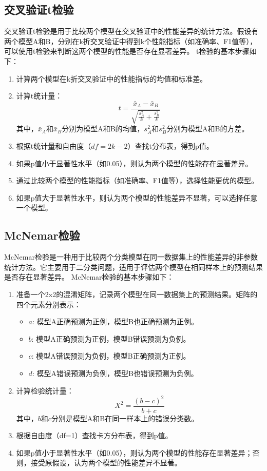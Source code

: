 \subsection{交叉验证t检验}
交叉验证t检验是用于比较两个模型在交叉验证中的性能差异的统计方法。假设有两个模型A和B，分别在k折交叉验证中得到k个性能指标（如准确率、F1值等），可以使用t检验来判断这两个模型的性能是否存在显著差异。
t检验的基本步骤如下：
\begin{enumerate}
    \item 计算两个模型在k折交叉验证中的性能指标的均值和标准差。
    \item 计算t统计量：
    \begin{equation}
        t = \frac{\bar{x}_A - \bar{x}_B}{\sqrt{\frac{s_A^2}{k} + \frac{s_B^2}{k}}}
    \end{equation}
    其中，$\bar{x}_A$和$\bar{x}_B$分别为模型A和B的均值，$s_A^2$和$s_B^2$分别为模型A和B的方差。
    \item 根据t统计量和自由度（$df = 2k - 2$）查找t分布表，得到p值。
    \item 如果p值小于显著性水平（如0.05），则认为两个模型的性能存在显著差异。
    \item 通过比较两个模型的性能指标（如准确率、F1值等），选择性能更优的模型。
    \item 如果p值大于显著性水平，则认为两个模型的性能差异不显著，可以选择任意一个模型。
\end{enumerate}
\subsection{McNemar检验}
McNemar检验是一种用于比较两个分类模型在同一数据集上的性能差异的非参数统计方法。它主要用于二分类问题，适用于评估两个模型在相同样本上的预测结果是否存在显著差异。
McNemar检验的基本步骤如下：
\begin{enumerate}
    \item 准备一个2x2的混淆矩阵，记录两个模型在同一数据集上的预测结果。矩阵的四个元素分别表示：
    \begin{itemize}
        \item $a$: 模型A正确预测为正例，模型B也正确预测为正例。
        \item $b$: 模型A正确预测为正例，模型B错误预测为负例。
        \item $c$: 模型A错误预测为负例，模型B正确预测为正例。
        \item $d$: 模型A错误预测为负例，模型B也错误预测为负例。
    \end{itemize}
    \item 计算检验统计量：
    \begin{equation}
        X^2 = \frac{(b - c)^2}{b + c}
    \end{equation}
    其中，$b$和$c$分别是模型A和B在同一样本上的错误分类数。
    \item 根据自由度（df=1）查找卡方分布表，得到p值。
    \item 如果p值小于显著性水平（如0.05），则认为两个模型的性能存在显著差异；否则，接受原假设，认为两个模型的性能差异不显著。
\end{enumerate}
